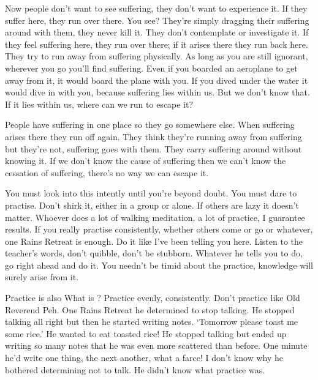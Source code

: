 Now people don't want to see suffering, they don't want to experience it. If they suffer here, they run over there. You see? They're simply dragging their suffering around with them, they never kill it. They don't contemplate or investigate it. If they feel suffering here, they run over there; if it arises there they run back here. They try to run away from suffering physically. As long as you are still ignorant, wherever you go you'll find suffering. Even if you boarded an aeroplane to get away from it, it would board the plane with you. If you dived under the water it would dive in with you, because suffering lies within us. But we don't know that. If it lies within us, where can we run to escape it?

People have suffering in one place so they go somewhere else. When suffering arises there they run off again. They think they're running away from suffering but they're not, suffering goes with them. They carry suffering around without knowing it. If we don't know the cause of suffering then we can't know the cessation of suffering, there's no way we can escape it.

You must look into this intently until you're beyond doubt. You must dare to practise. Don't shirk it, either in a group or alone. If others are lazy it doesn't matter. Whoever does a lot of walking meditation, a lot of practice, I guarantee results. If you really practise consistently, whether others come or go or whatever, one Rains Retreat is enough. Do it like I've been telling you here. Listen to the teacher's words, don't quibble, don't be stubborn. Whatever he tells you to do, go right ahead and do it. You needn't be timid about the practice, knowledge will surely arise from it.

Practice is also  What is ? Practice evenly, consistently. Don't practice like Old Reverend Peh. One Rains Retreat he determined to stop talking. He stopped talking all right but then he started writing notes. `Tomorrow please toast me some rice.' He wanted to eat toasted rice! He stopped talking but ended up writing so many notes that he was even more scattered than before. One minute he'd write one thing, the next another, what a farce! I don't know why he bothered determining not to talk. He didn't know what practice was.

